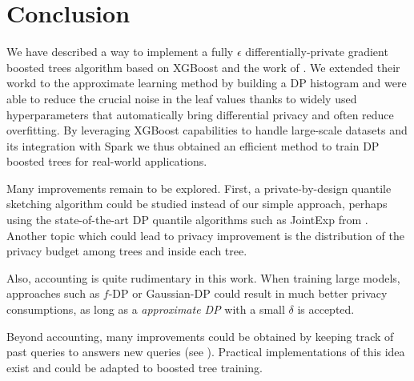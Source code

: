 \documentclass{article}
\theoremstyle{definition}
\begin{document}
\section{Conclusion} 

We have described a way to implement a fully $\epsilon$ differentially-private gradient boosted trees algorithm based on XGBoost and the work of \cite{li2020privacy}.
We extended their workd to the approximate learning method by building a DP histogram and were able to reduce the crucial noise in the leaf values thanks to widely used hyperparameters that automatically bring differential privacy and often reduce overfitting. By leveraging XGBoost capabilities to handle large-scale datasets and its integration with Spark we thus obtained an efficient method to train DP boosted trees for real-world applications. 

Many improvements remain to be explored. First, a private-by-design quantile sketching algorithm could be studied instead of our simple approach,
perhaps using the state-of-the-art DP quantile algorithms such as JointExp from \cite{gillenwater2021}.
Another topic which could lead to privacy improvement is the distribution of the privacy budget among trees and inside each tree. 

Also, accounting is quite rudimentary in this work. When training large models, approaches such as $f$-DP or Gaussian-DP \cite{dong2019gaussian} could result in
much better privacy consumptions, as long as a \emph{approximate DP} with a small $\delta$ is accepted.

Beyond accounting, many improvements could be obtained by keeping track of past queries to answers new queries (see \cite{dwork2012privacy}).
Practical implementations of this idea exist \cite{kotsogiannis2019privatesql, kotsogiannis2019architecting} and could be adapted to boosted tree training.
 


\end{document}
